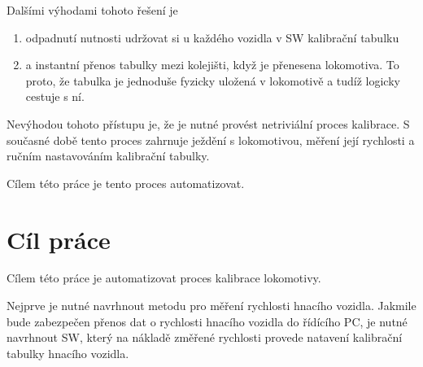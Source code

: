 Dalšími výhodami tohoto řešení je

\begin{enumerate}
	\item odpadnutí nutnosti udržovat si u každého vozidla v SW kalibrační
	tabulku
	\item a instantní přenos tabulky mezi kolejišti, když je přenesena
	lokomotiva. To proto, že tabulka je jednoduše fyzicky uložená v lokomotivě a
	tudíž logicky cestuje s ní.
\end{enumerate}

Nevýhodou tohoto přístupu je, že je nutné provést netriviální proces kalibrace.
S současné době tento proces zahrnuje ježdění s lokomotivou, měření její
rychlosti a ručním nastavováním kalibrační tabulky.

Cílem této práce je tento proces automatizovat.

\section{Cíl práce}

Cílem této práce je automatizovat proces kalibrace lokomotivy.

Nejprve je nutné navrhnout metodu pro měření rychlosti hnacího vozidla. Jakmile
bude zabezpečen přenos dat o rychlosti hnacího vozidla do řídícího PC, je
nutné navrhnout SW, který na nákladě změřené rychlosti provede natavení
kalibrační tabulky hnacího vozidla.
